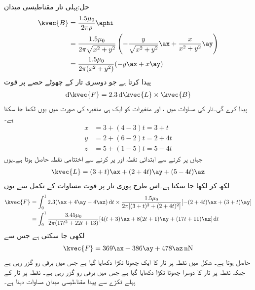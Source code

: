 حل:پہلی تار مقناطیسی میدان 
\begin{align*}
\kvec{B}&=\frac{1.5 \mu_0}{2\pi \rho}\aphi\\
&=\frac{1.5\mu_0}{2\pi \sqrt{x^2+y^2}}\left(-\frac{y}{\sqrt{x^2+y^2}}\ax+\frac{x}{x^2+y^2}\ay\right)\\
&=\frac{1.5\mu_0}{2\pi(x^2+y^2)}(-y\ax+x\ay)
\end{align*}
پیدا کرتا ہے جو دوسری تار کے چھوٹے حصے  پر قوت
\begin{align}\label{مثال_امالہ_ترچی_تار}
\dif \kvec{F}=2.3 \dif \kvec{L} \times \kvec{B}
\end{align} 
پیدا کرے گی۔تار کی مساوات  میں ،  اور  متغیرات کو ایک ہی متغیرہ  کی صورت میں یوں لکھا جا سکتا ہے۔
\begin{align*}
x&=3+(4-3)t=3+t\\
y&=2+(6-2)t=2+4t\\
z&=5+(1-5)t=5-4t
\end{align*}
جہاں  پر کرنے سے ابتدائی نقطہ  اور  پر کرنے سے اختتامی نقطہ  حاصل ہوتا ہے۔یوں
\begin{align*}
\kvec{L}=(3+t)\ax+(2+4t)\ay+(5-4t)\az
\end{align*}
لکھ کر  لکھا جا سکتا ہے۔اس طرح پوری تار پر قوت مساوات  کے تکمل سے یوں 
\begin{align*}
\kvec{F}&=\int_0^1 2.3 ( \ax+4\ay-4 \az)\dif t \times \frac{1.5\mu_0}{2\pi[(3+t)^2+(2+4t)^2]}[-(2+4t)\ax+(3+t)\ay]\\
&=\int_0^1 \frac{3.45\mu_0}{2\pi(17t^2+22t+13)}[4(t+3)\ax+8(2t+1)\ay+(17t+11)\az]\dif t
\end{align*}
لکھی جا سکتی ہے جس سے
\begin{align*}
\kvec{F}=369\ax+386\ay+478\az \, \si{\nano\newton}
\end{align*}
حاصل ہوتا ہے۔
شکل میں نقطہ  پر تار کا ایک چھوٹا ٹکڑا  دکھایا گیا ہے جس میں  برقی رو گزر رہی ہے  جبکہ نقطہ  پر تار کا دوسرا چھوٹا ٹکڑا  دکھایا گیا ہے جس میں  برقی رو گزر رہی ہے۔ نقطہ  پر تار کے پہلے ٹکڑے سے پیدا مقناطیسی میدان مساوات  دیتا ہے۔

